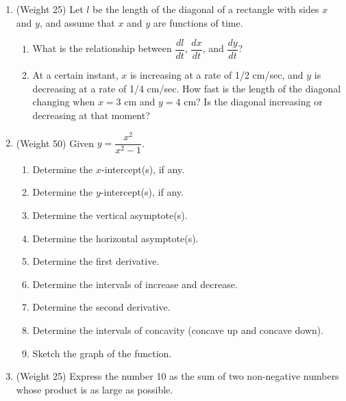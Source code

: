 \documentclass[11pt,a4paper]{article}
\begin{document}
\begin{enumerate}
  \item (Weight 25) Let $l$ be the length of the diagonal of a rectangle with sides $x$ and $y$, and assume that $x$ and $y$ are functions of time.
        \begin{enumerate}
          \item What is the relationship between $\dfrac{dl}{dt}$, $\dfrac{dx}{dt}$, and $\dfrac{dy}{dt}$?
          \item At a certain instant, $x$ is increasing at a rate of 1/2 cm/sec, and $y$ is decreasing at a rate of 1/4 cm/sec. How fast is the length of the diagonal changing when $x = 3\text{ cm}$ and $y = 4\text{ cm}$? Is the diagonal increasing or decreasing at that moment?
        \end{enumerate}

  \item (Weight 50) Given $y = \dfrac{x^2}{x^2 - 1}$.
        \begin{enumerate}
          \item Determine the $x$-intercept(s), if any.
          \item Determine the $y$-intercept(s), if any.
          \item Determine the vertical asymptote(s).
          \item Determine the horizontal asymptote(s).
          \item Determine the first derivative.
          \item Determine the intervals of increase and decrease.
          \item Determine the second derivative.
          \item Determine the intervals of concavity (concave up and concave down).
          \item Sketch the graph of the function.
        \end{enumerate}

  \item (Weight 25) Express the number 10 as the sum of two non-negative numbers whose product is as large as possible.
\end{enumerate}
\end{document}

